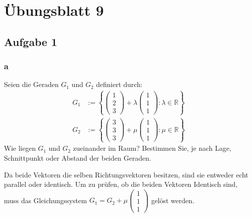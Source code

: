 \chapter{Übungsblatt 9}

\section{Aufgabe 1}

\subsection{a}
Seien die Geraden $G_1$ und $G_2$ definiert durch:
\begin{align*}
G_1 &:= \left\{\begin{pmatrix}
1 \\ 2 \\ 3
\end{pmatrix} + \lambda \begin{pmatrix}
1 \\ 1 \\ 1
\end{pmatrix}: \lambda \in \mathbb{R}\right\} \\
G_2 &:= \left\{\begin{pmatrix}
3 \\ 3 \\ 3
\end{pmatrix} + \mu \begin{pmatrix}
1 \\ 1 \\ 1
\end{pmatrix}: \mu \in \mathbb{R}\right\}
\end{align*}
Wie liegen $G_1$ und $G_2$ zueinander im Raum? Bestimmen Sie, je nach Lage, Schnittpunkt oder Abstand der beiden Geraden.

Da beide Vektoren die selben Richtungsvektoren besitzen, sind sie entweder echt parallel oder identisch. Um zu prüfen, ob die beiden Vektoren Identisch sind, muss das Gleichungssystem $G_1 = G_2 + \mu \begin{pmatrix}
    1 \\ 1 \\ 1
\end{pmatrix}$ gelöst werden.

